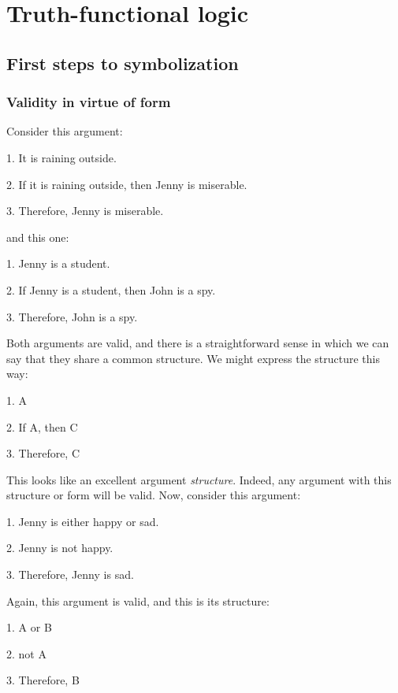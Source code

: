 \part{Truth-functional logic}
\label{ch.TFL}

\chapter{First steps to symbolization}

\section{Validity in virtue of form}\label{s:ValidityInVirtueOfForm}
Consider this argument:
	\begin{earg}
		\item[1.] It is raining outside.
		\item[2.] If it is raining outside, then Jenny is miserable.
		\item[3.] Therefore, Jenny is miserable.
	\end{earg}
and this one:
	\begin{earg}
		\item[1.] Jenny is a student.
		\item[2.] If Jenny is a student, then John is a spy.
		\item[3.] Therefore, John is a spy.
	\end{earg}
Both arguments are valid, and there is a straightforward sense in which we can say that they share a common structure. We might express the structure this way:
	\begin{earg}
		\item[1.] A
		\item[2.] If A, then C
		\item[3.] Therefore, C
	\end{earg}
This looks like an excellent argument \emph{structure}. Indeed, any argument with this structure or form will be valid. Now, consider this argument:
	\begin{earg}
		\item[1.] Jenny is either happy or sad.
		\item[2.] Jenny is not happy.
		\item[3.] Therefore, Jenny is sad.
	\end{earg}
Again, this argument is valid, and this is its structure:
	\begin{earg}
		\item[1.] A or B
		\item[2.] not A
		\item[3.] Therefore, B
	\end{earg}
